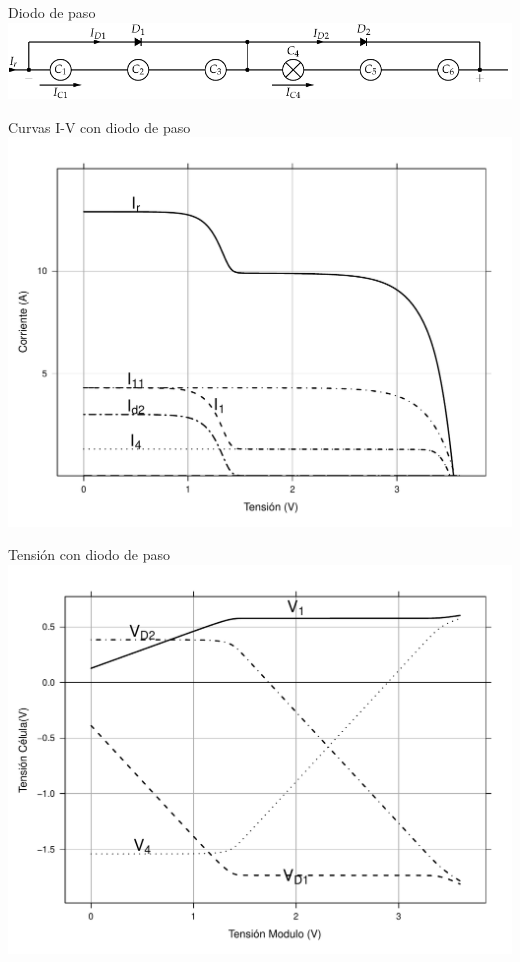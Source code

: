 \documentclass[xcolor={usenames,svgnames,dvipsnames}]{beamer}
\begin{document}
\begin{frame}[label=sec-1-3-4]{Diodo de paso}
\includegraphics[width=.9\linewidth]{../figs/AsociacionSerieCelulas_DiodosPaso.pdf}
\end{frame}

\begin{frame}[label=sec-1-3-5]{Curvas I-V con diodo de paso}
\includegraphics[width=.9\linewidth]{../figs/CurvaIV_DiodoPaso.pdf}
\end{frame}

\begin{frame}[label=sec-1-3-6]{Tensión con diodo de paso}
\includegraphics[width=.9\linewidth]{../figs/TensionesCelulasDiodos_DiodoPaso.pdf}
\end{frame}
\end{document}
